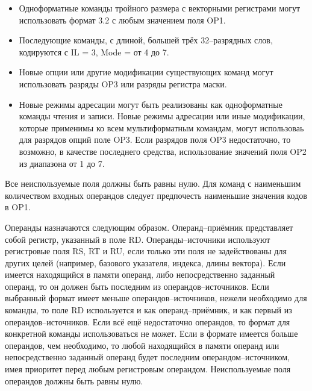 \documentclass[forwardcom.tex]{subfiles}
\begin{document}
\begin{itemize}
\item Одноформатные команды тройного размера с векторными регистрами могут использовать формат 3.2 с любым значением поля OP1.

\item Последующие команды, с длиной, большей трёх 32--разрядных слов, кодируются с IL = 3, Mode = от 4 до 7.

\item Новые опции или другие модификации существующих команд могут использовать разряды OP3 или разряды регистра маски.

\item Новые режимы адресации могут быть реализованы как одноформатные команды чтения и записи. Новые режимы адресации или иные модификации, которые применимы ко всем мультиформатным командам, могут использоваь для разрядов опций поле OP3. Если разрядов поля OP3 недостаточно, то возможно, в качестве последнего средства, использование значений поля OP2 из диапазона от 1 до 7.
\end{itemize}

Все неиспользуемые поля должны быть равны нулю. Для команд с наименьшим количеством входных операндов следует предпочесть наименьшие значения кодов в OP1.

Операнды назначаются следующим образом. Операнд--приёмник представляет собой регистр, указанный в поле RD. Операнды--источники используют регистровые поля RS, RT и RU, если только эти поля не задействованы для других целей (например, базового указателя, индекса, длины вектора). Если имеется находящийся в памяти операнд, либо непосредственно заданный операнд, то он должен быть последним из операндов--источников. Если выбранный формат имеет меньше операндов--источников, нежели необходимо для команды, то поле RD используется и как операнд--приёмник, и как первый из операндов--источников. Если всё ещё недостаточно операндов, то формат для конкретной команды использоваться не может. Если в формате имеется больше операндов, чем необходимо, то любой находящийся в памяти операнд или непосредственно заданный операнд будет последним операндом--источником, имея приоритет перед любым регистровым операндом. Неиспользуемые поля операндов должны быть равны нулю.
\end{document}
